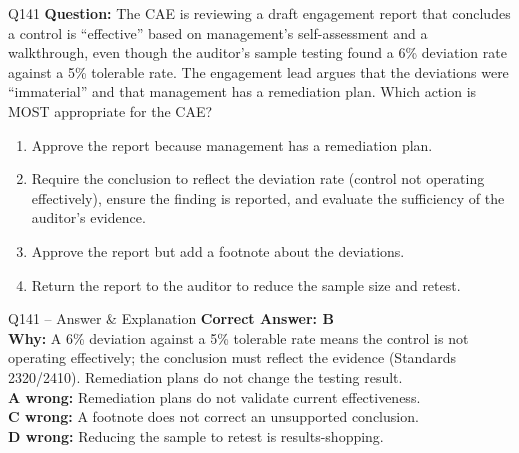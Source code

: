 \documentclass[aspectratio=169,10pt]{beamer}
\begin{document}
	\begin{frame}[t]{Q141}
		\small
		\textbf{Question:} The CAE is reviewing a draft engagement report that concludes a control is ``effective'' based on management's self-assessment and a walkthrough, even though the auditor's sample testing found a 6\% deviation rate against a 5\% tolerable rate. The engagement lead argues that the deviations were ``immaterial'' and that management has a remediation plan. Which action is MOST appropriate for the CAE?
		\begin{enumerate}[label=\Alph*.,itemsep=1pt,topsep=2pt]
			\item Approve the report because management has a remediation plan.
			\item Require the conclusion to reflect the deviation rate (control not operating effectively), ensure the finding is reported, and evaluate the sufficiency of the auditor's evidence.
			\item Approve the report but add a footnote about the deviations.
			\item Return the report to the auditor to reduce the sample size and retest.
		\end{enumerate}
	\end{frame}
	
	\begin{frame}[t]{Q141 -- Answer \& Explanation}
		\small
		\textbf{Correct Answer: B} \\[4pt]
		\textbf{Why:} A 6\% deviation against a 5\% tolerable rate means the control is not operating effectively; the conclusion must reflect the evidence (Standards 2320/2410). Remediation plans do not change the testing result. \\[4pt]
		\textbf{A wrong:} Remediation plans do not validate current effectiveness. \\[2pt]
		\textbf{C wrong:} A footnote does not correct an unsupported conclusion. \\[2pt]
		\textbf{D wrong:} Reducing the sample to retest is results-shopping.
	\end{frame}
	
\end{document}
